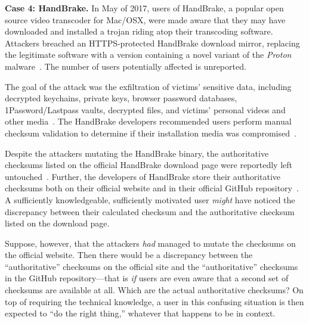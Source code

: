 \noindent\textbf{Case 4: HandBrake.} In May of 2017, users of HandBrake, a
popular open source video transcoder for Mac/OSX, were made aware that they may
have downloaded and installed a trojan riding atop their transcoding software.
Attackers breached an HTTPS-protected HandBrake download mirror, replacing the
legitimate software with a version containing a novel variant of the
\emph{Proton} malware~\cite{SCA-HB1}. The number of users potentially affected
is unreported.

The goal of the attack was the exfiltration of victims' sensitive data,
including decrypted keychains, private keys, browser password databases,
1Password/Lastpass vaults, decrypted files, and victims' personal videos and
other media~\cite{SCA-HB1}. The HandBrake developers recommended users perform
manual checksum validation to determine if their installation media was
compromised~\cite{SCA-HB2}.

Despite the attackers mutating the HandBrake binary, the authoritative checksums
listed on the official HandBrake download page were reportedly left
untouched~\cite{SCA-HB2}. Further, the developers of HandBrake store their
authoritative checksums both on their official website and in their official
GitHub repository~\cite{SCA-HB2}. A sufficiently knowledgeable, sufficiently
motivated user \emph{might} have noticed the discrepancy between their
calculated checksum and the authoritative checksum listed on the download page.

Suppose, however, that the attackers \textit{had} managed to mutate the
checksums on the official website. Then there would be a discrepancy between the
``authoritative'' checksums on the official site and the ``authoritative''
checksums in the GitHub repository---that is \emph{if} users are even aware that
a second set of checksums are available at all. Which are the actual
authoritative checksums? On top of requiring the technical knowledge, a user in
this confusing situation is then expected to ``do the right thing,'' whatever
that happens to be in context.

